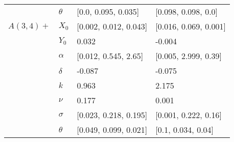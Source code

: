 \begin{tabular}{llll}
	& $\theta$ &    [0.0, 0.095, 0.035] &    [0.098, 0.098, 0.0] \\
	$A(3, 4)+$ & $X_0$ &  [0.002, 0.012, 0.043] &  [0.016, 0.069, 0.001] \\
	& $Y_0$ &                  0.032 &                 -0.004 \\
	& $\alpha$ &   [0.012, 0.545, 2.65] &   [0.005, 2.999, 0.39] \\
	& $\delta$ &                 -0.087 &                 -0.075 \\
	& $k$ &                  0.963 &                  2.175 \\
	& $\nu$ &                  0.177 &                  0.001 \\
	& $\sigma$ &  [0.023, 0.218, 0.195] &   [0.001, 0.222, 0.16] \\
	& $\theta$ &  [0.049, 0.099, 0.021] &     [0.1, 0.034, 0.04] \\
	\bottomrule
\end{tabular}

